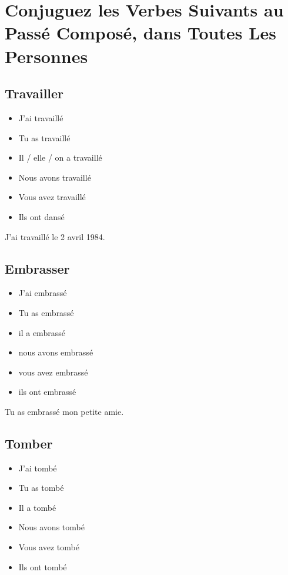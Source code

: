 \section{Conjuguez les Verbes Suivants au Passé Composé, dans Toutes Les Personnes}

\subsection{Travailler}

\begin{itemize}
    \item J'ai travaillé
    \item Tu as travaillé
    \item Il / elle / on a travaillé
    \item Nous avons travaillé
    \item Vous avez travaillé
    \item Ils ont dansé
\end{itemize}

J'ai travaillé le 2 avril 1984.

\subsection{Embrasser}

\begin{itemize}
    \item J'ai embrassé
    \item Tu as embrassé
    \item il a embrassé
    \item nous avons embrassé
    \item vous avez embrassé
    \item ils ont embrassé
\end{itemize}

Tu as embrassé mon petite amie.

\subsection{Tomber}

\begin{itemize}
    \item J'ai tombé
    \item Tu as tombé 
    \item Il a tombé
    \item Nous avons tombé 
    \item Vous avez tombé 
    \item Ils ont tombé
\end{itemize}

